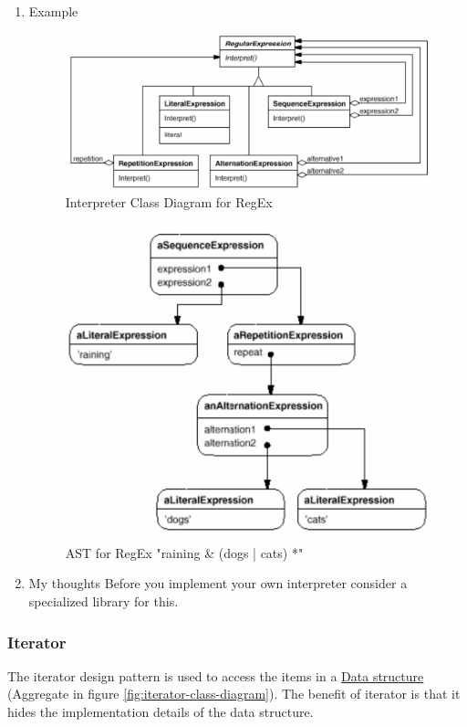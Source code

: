 \documentclass[11pt]{article}
\begin{document}
\begin{enumerate}
\item Example
\label{sec:org5e2a7c0}
\begin{figure}[htbp]
\centering
\includegraphics[width=.9\linewidth]{img/interpreter_regex.png}
\caption{\label{fig:interpreter-class-diagram-for-regex}Interpreter Class Diagram for RegEx}
\end{figure}

\begin{figure}[htbp]
\centering
\includegraphics[width=.9\linewidth]{img/interpreter_regex_ast.png}
\caption{\label{fig:ast-for-regex}AST for RegEx "raining \& (dogs | cats) *"}
\end{figure}


\item My thoughts
\label{sec:org80e9a19}
Before you implement your own interpreter consider a specialized library for this.
\end{enumerate}
\subsubsection{Iterator}
\label{sec:org134f79a}
The iterator design pattern is used to access the items in a \href{../../../../roam/20210518131131-datastructure.org}{Data structure} (Aggregate in figure \ref{fig:iterator-class-diagram}).
The benefit of iterator is that it hides the implementation details of the data structure.
\end{document}
